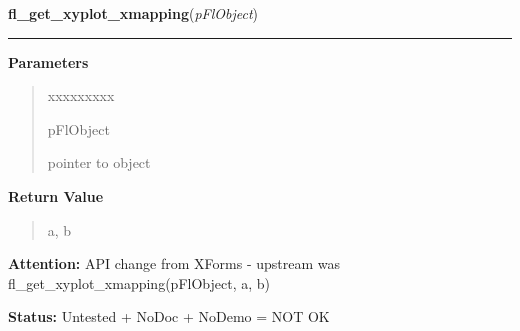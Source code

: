 \hspace{.8\funcindent}\begin{boxedminipage}{\funcwidth}

    \raggedright \textbf{fl\_get\_xyplot\_xmapping}(\textit{pFlObject})

    \vspace{-1.5ex}

    \rule{\textwidth}{0.5\fboxrule}
\setlength{\parskip}{2ex}
\setlength{\parskip}{1ex}
      \textbf{Parameters}
      \vspace{-1ex}

      \begin{quote}
        \begin{Ventry}{xxxxxxxxx}

          \item[pFlObject]

          pointer to object

        \end{Ventry}

      \end{quote}

      \textbf{Return Value}
    \vspace{-1ex}

      \begin{quote}
      a, b

      \end{quote}

\textbf{Attention:} API change from XForms - upstream was fl\_get\_xyplot\_xmapping(pFlObject, 
a, b)



\textbf{Status:} Untested + NoDoc + NoDemo = NOT OK



    \end{boxedminipage}

    \label{xformslib:flxyplot:fl_get_xyplot_ymapping}

    \vspace{0.5ex}

